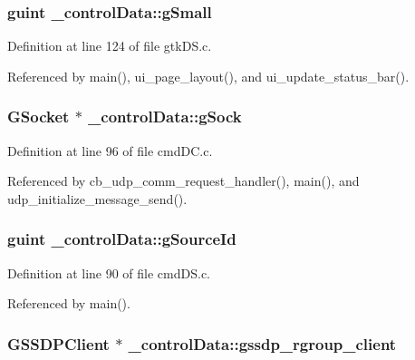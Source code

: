 \hypertarget{struct__control_data_aa53ce6d64a23cb93cc0c98e0835b6449}{
\subsubsection[{g\+Small}]{\setlength{\rightskip}{0pt plus 5cm}guint \+\_\+control\+Data\+::g\+Small}}\label{struct__control_data_aa53ce6d64a23cb93cc0c98e0835b6449}


Definition at line 124 of file gtk\+D\+S.\+c.



Referenced by main(), ui\+\_\+page\+\_\+layout(), and ui\+\_\+update\+\_\+status\+\_\+bar().

\hypertarget{struct__control_data_a49b267275036fc3ac9b7d9e53b0625e1}{
\subsubsection[{g\+Sock}]{\setlength{\rightskip}{0pt plus 5cm}G\+Socket $\ast$ \+\_\+control\+Data\+::g\+Sock}}\label{struct__control_data_a49b267275036fc3ac9b7d9e53b0625e1}


Definition at line 96 of file cmd\+D\+C.\+c.



Referenced by cb\+\_\+udp\+\_\+comm\+\_\+request\+\_\+handler(), main(), and udp\+\_\+initialize\+\_\+message\+\_\+send().

\hypertarget{struct__control_data_a719187f5c3c94da5aa08616db7820b98}{
\subsubsection[{g\+Source\+Id}]{\setlength{\rightskip}{0pt plus 5cm}guint \+\_\+control\+Data\+::g\+Source\+Id}}\label{struct__control_data_a719187f5c3c94da5aa08616db7820b98}


Definition at line 90 of file cmd\+D\+S.\+c.



Referenced by main().

\hypertarget{struct__control_data_a05dec2c5c598d299306a41430093b6de}{
\subsubsection[{gssdp\+\_\+rgroup\+\_\+client}]{\setlength{\rightskip}{0pt plus 5cm}G\+S\+S\+D\+P\+Client $\ast$ \+\_\+control\+Data\+::gssdp\+\_\+rgroup\+\_\+client}}\label{struct__control_data_a05dec2c5c598d299306a41430093b6de}


